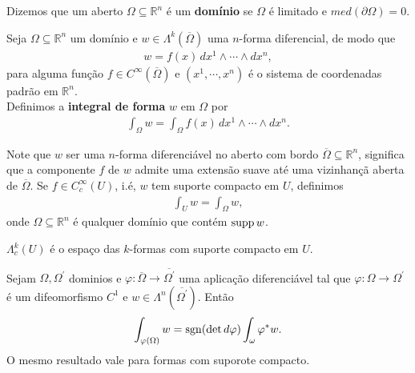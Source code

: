 \begin{definition}[Domínio]
  Dizemos que um aberto $\Omega\subseteq\mathbb{R}^{n}$ é um \textbf{domínio} se $\Omega$ é limitado e $med(\partial\Omega)=0$. 
\end{definition}
\begin{definition}
  Seja $\Omega\subseteq\mathbb{R}^{n}$ um domínio e $w\in\Lambda^{k}(\overline{\Omega})$ uma $n$-forma diferencial, de modo que
  \begin{align*}
    w=f(x)\,dx^{1}\wedge\cdots\wedge dx^{n},
  \end{align*}
  para alguma função $f\in C^{\infty}(\overline{\Omega})$ e $(x^{1},\cdots,x^{n})$ é o sistema de coordenadas padrão em $\mathbb{R}^{n}$.\\
  Definimos a \textbf{integral de forma} $w$ em $\Omega$ por
  \begin{align*}
    \int_{\Omega}w=\int_{\Omega}f(x)\,dx^{1}\wedge\cdots\wedge dx^{n}.
  \end{align*}
\end{definition}
\begin{note}
  Note que $w$  ser uma $n$-forma diferenciável no aberto com bordo $\overline{\Omega}\subseteq\mathbb{R}^{n}$, significa que a componente $f$ de $w$ admite uma extensão suave até uma vizinhançã aberta de $\overline{\Omega}$. Se $f\in C^{\infty}_{c}(U)$, i.é, $w$ tem suporte compacto em $U$, definimos
  \begin{align*}
    \int_{U}w=\int_{\Omega}w,
  \end{align*}
  onde $\Omega\subseteq\mathbb{R}^{n}$ é qualquer domínio que contém $\operatorname{supp} w$. 
\end{note}
\begin{notation}
  $\Lambda^{k}_c(U)$ é o espaço das $k$-formas com suporte compacto em $U$. 
\end{notation}
\begin{proposition}
  Sejam $\Omega,\Omega^{\prime}$ dominios e $\varphi:\overline{\Omega}\to\overline{\Omega^{\prime}}$ uma aplicação diferenciável tal que $\varphi:\Omega\to\Omega^{\prime}$ é um difeomorfismo $C^{1}$ e $w\in\Lambda^{n}(\overline{\Omega^{\prime}})$. Então
  \begin{align*}
    \int_{\varphi(\Omega)}w=\operatorname{sgn}(\det d\varphi)\int_{\omega}\varphi^{\ast}w.
  \end{align*}
  O mesmo resultado vale para formas com suporote compacto.
\end{proposition}
